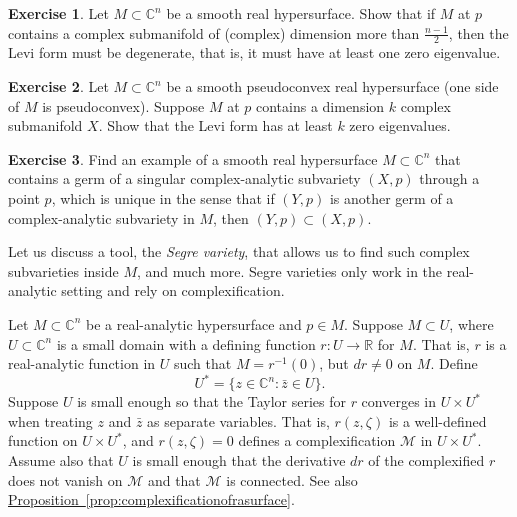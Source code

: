 \documentclass[12pt,openany]{book}
\newcommand{\C}{{\mathbb{C}}}
\newcommand{\R}{{\mathbb{R}}}
\newcommand{\sM}{{\mathscr{M}}}
\newcommand{\myindex}[1]{#1\index{#1}}
\theoremstyle{plain}
\theoremstyle{remark}
\theoremstyle{definition}
\newenvironment{exbox}{%
    \def\FrameCommand{\vrule width 1pt \relax\hspace{10pt}}%
    \MakeFramed{\advance\hsize-\width\FrameRestore}%
}{%
    \endMakeFramed
}
\theoremstyle{exercise}
\newtheorem{exercise}{Exercise}[section]
\theoremstyle{example}
\newcommand{\propref}[1]{\hyperref[#1]{Proposition~\ref*{#1}}}
\begin{document}
\begin{exbox}
\begin{exercise}
Let $M \subset \C^n$ be a smooth real hypersurface.
Show that if $M$ at $p$ contains a complex submanifold of (complex)
dimension more than
$\frac{n-1}{2}$, then the Levi form must be degenerate, that is, it must
have at least one zero eigenvalue.
\end{exercise}

\begin{exercise}
Let $M \subset \C^n$ be a smooth pseudoconvex real hypersurface
(one side of $M$ is pseudoconvex).
Suppose $M$ at $p$ contains a dimension $k$ complex submanifold $X$.
Show that the Levi form has at least $k$ zero eigenvalues.
\end{exercise}

\begin{exercise}
Find an example of a smooth real hypersurface $M \subset \C^n$ that contains a
germ of a singular complex-analytic subvariety $(X,p)$ through a point $p$,
which is unique in the sense that if $(Y,p)$ is another germ of a
complex-analytic subvariety in $M$, then $(Y,p) \subset (X,p)$.
\end{exercise}
\end{exbox}

Let us discuss a tool, the \emph{\myindex{Segre variety}}, that allows us to
find such complex subvarieties inside $M$, and much more.  Segre varieties only
work in the real-analytic setting and rely on complexification.

Let $M \subset \C^n$ be a real-analytic hypersurface and $p \in M$.
Suppose $M \subset U$,
where $U \subset \C^n$ is a small domain with a defining function $r \colon
U  \to \R$ for $M$.  That is, $r$ is a real-analytic function in $U$ such that
$M = r^{-1}(0)$, but
$dr \neq 0$ on $M$.  Define
%
\begin{equation*}
U^* = \bigl\{ z \in \C^n : \bar{z} \in U \bigr\} .
\end{equation*}
Suppose $U$ is small enough so that the Taylor series for $r$
converges in $U \times U^*$ when treating $z$ and $\bar{z}$ as separate
variables.  That is, $r(z,\zeta)$ is a well-defined function on
$U \times U^*$, and $r(z,\zeta) = 0$ defines a complexification $\sM$
in $U \times U^*$.  Assume also that $U$ is small enough that
the derivative $dr$ of the complexified $r$ does not vanish on
$\sM$ and that $\sM$ is connected.
See also \propref{prop:complexificationofrasurface}.
\end{document}
